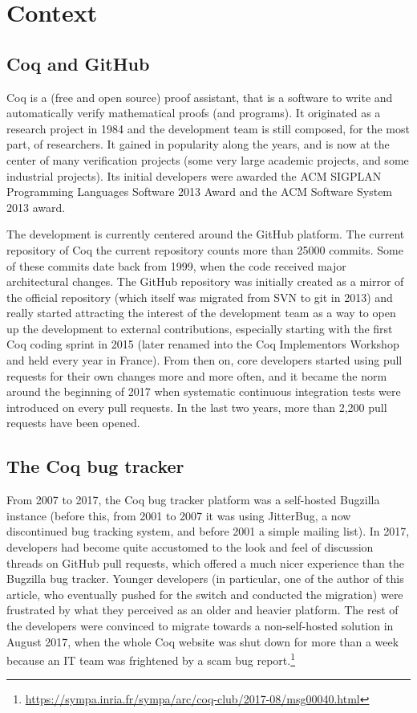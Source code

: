 \documentclass[runningheads]{llncs}
\begin{document}
\section{Context}

\subsection{Coq and GitHub}
Coq is a (free and open source) proof assistant, that is a software to write and automatically verify mathematical proofs (and programs). It originated as a research project in 1984 and the development team is still composed, for the most part, of researchers. It gained in popularity along the years, and is now at the center of many verification projects (some very large academic projects, and some industrial projects). Its initial developers were awarded  the ACM SIGPLAN Programming Languages Software 2013 Award and the ACM Software System 2013 award.

The development is currently centered around the GitHub platform. The current repository of Coq the current repository counts more than 25000 commits. Some of these commits date back from 1999, when the code received major architectural changes. The GitHub repository was initially created as a mirror of the official repository (which itself was migrated from SVN to git in 2013) and really started attracting the interest of the development team as a way to open up the development to external contributions, especially starting with the first Coq coding sprint in 2015 (later renamed into the Coq Implementors Workshop and held every year in France). From then on, core developers started using pull requests for their own changes more and more often, and it became the norm around the beginning of 2017 when systematic continuous integration tests were introduced on every pull requests. In the last two years, more than 2,200 pull requests have been opened.

\subsection{The Coq bug tracker}

From 2007 to 2017, the Coq bug tracker platform was a self-hosted Bugzilla instance (before this, from 2001 to 2007 it was using JitterBug, a now discontinued bug tracking system, and before 2001 a simple mailing list). In 2017, developers had become quite accustomed to the look and feel of discussion threads on GitHub pull requests, which offered a much nicer experience than the Bugzilla bug tracker. Younger developers (in particular, one of the author of this article, who eventually pushed for the switch and conducted the migration) were frustrated by what they perceived as an older and heavier platform. The rest of the developers were convinced to migrate towards a non-self-hosted solution in August 2017, when the whole Coq website was shut down for more than a week  because an IT team was frightened by a scam bug report.\footnote{\url{https://sympa.inria.fr/sympa/arc/coq-club/2017-08/msg00040.html}}
\end{document}
